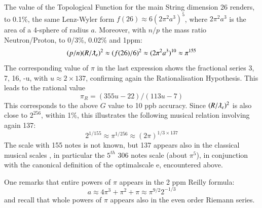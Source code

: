 \documentclass[twoside,draft]{article}
\begin{document}
\begin{sloppypar}
The value of the Topological Function for the main String
 dimension 26 renders, to 0.1\%, the same Lenz-Wyler form $f(26) \approx 6(2\pi^{2} a^{3} )^{5}$, where $2\pi^{2}a^{3}$ is the area of a 4-sphere of radius $a$. Moreover, with $n/p$ the mass ratio Neutron/Proton, to 0/3\%, 0.02\% and 1ppm:
$$(p/n) (R/\lambdabar_{e})^{2} \approx (f(26)/6)^{2} \approx (2\pi^{2} a^{3})^{10} \approx \pi^{155}$$
The corresponding value of $\pi$ in the last expression shows the fractional series 3, 7, 16, -u, with $u \approx
2 \times 137$, confirming again the Rationalisation Hypothesis. This leads to the rational value
\begin{equation}
\pi_{R} = (355u-22)/(113u-7) 
\end{equation}
This corresponds to the above $G$ value to 10 ppb accuracy.
Since $(R/\lambdabar_{e})^{2}$ is also close to $2^{256}$, within 1\%, this illustrates the following musical relation involving again 137:
$$2^{1/155} \approx \pi^{1/256} \approx (2\pi)^{1/3 \times 137}$$
The scale with 155 notes is not known, but 137 appears also in the classical musical scales \cite{Sanchez1}, in
particular the $5^{th}$ 306 notes scale (about $\pi^{5}$), in conjunction with the canonical definition of the optimalscale e, encountered above.

One remarks that entire powers of $\pi$ appears in the 2 ppm Reilly formula: 
\begin{equation}
a \approx 4\pi^{3} + \pi^{2} + \pi \approx \pi^{9/2}2^{-1/3}
\end{equation}
and recall that whole powers of $\pi$ appears also in the even order Riemann series.


\end{sloppypar}
\end{document}
